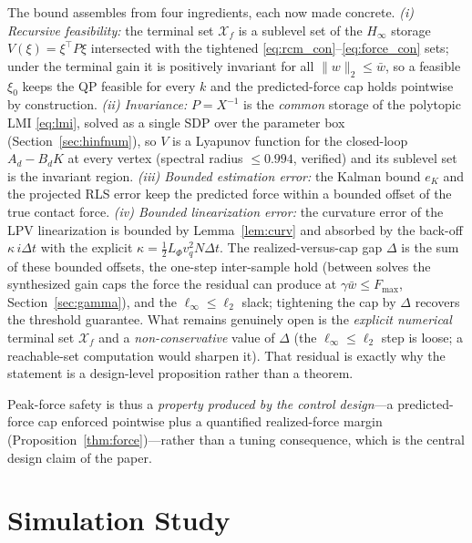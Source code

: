 \begin{IEEEproof}
The bound assembles from four ingredients, each now made concrete. \emph{(i) Recursive feasibility:} the terminal set $\mathcal{X}_f$ is a sublevel set of the $H_\infty$ storage $V(\xi)=\xi^\top P\xi$ intersected with the tightened \eqref{eq:rcm_con}--\eqref{eq:force_con} sets; under the terminal gain it is positively invariant for all $\|w\|_2\le\bar w$, so a feasible $\xi_0$ keeps the QP feasible for every $k$ and the predicted-force cap holds pointwise by construction. \emph{(ii) Invariance:} $P=X^{-1}$ is the \emph{common} storage of the polytopic LMI \eqref{eq:lmi}, solved as a single SDP over the parameter box (Section~\ref{sec:hinfnum}), so $V$ is a Lyapunov function for the closed-loop $A_d-B_dK$ at every vertex (spectral radius $\le0.994$, verified) and its sublevel set is the invariant region. \emph{(iii) Bounded estimation error:} the Kalman bound $e_K$ and the projected RLS error keep the predicted force within a bounded offset of the true contact force. \emph{(iv) Bounded linearization error:} the curvature error of the LPV linearization is bounded by Lemma~\ref{lem:curv} and absorbed by the back-off $\kappa\,i\Delta t$ with the explicit $\kappa=\tfrac12 L_\Phi v_q^2 N\Delta t$. The realized-versus-cap gap $\Delta$ is the sum of these bounded offsets, the one-step inter-sample hold (between solves the synthesized gain caps the force the residual can produce at $\gamma\bar w\le F_{\max}$, Section~\ref{sec:gamma}), and the $\ell_\infty\!\le\!\ell_2$ slack; tightening the cap by $\Delta$ recovers the threshold guarantee. What remains genuinely open is the \emph{explicit numerical} terminal set $\mathcal{X}_f$ and a \emph{non-conservative} value of $\Delta$ (the $\ell_\infty\!\le\!\ell_2$ step is loose; a reachable-set computation would sharpen it). That residual is exactly why the statement is a design-level proposition rather than a theorem.
\end{IEEEproof}

Peak-force safety is thus a \emph{property produced by the control design}---a predicted-force cap enforced pointwise plus a quantified realized-force margin (Proposition~\ref{thm:force})---rather than a tuning consequence, which is the central design claim of the paper.

\section{Simulation Study}\label{sec:sim}

